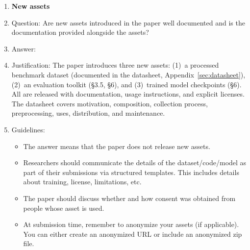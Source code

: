 \begin{enumerate}
\item {\bf New assets}
    \item[] Question: Are new assets introduced in the paper well documented and is the documentation provided alongside the assets?
    \item[] Answer: \answerYes{}
    \item[] Justification: The paper introduces three new assets:
      (1)~a processed benchmark dataset (documented in the datasheet,
      Appendix~\ref{sec:datasheet}), (2)~an evaluation toolkit (\S3.5, \S6), and
      (3)~trained model checkpoints (\S6).  All are released with
      documentation, usage instructions, and explicit licenses.
      The datasheet covers motivation, composition, collection
      process, preprocessing, uses, distribution, and maintenance.
    \item[] Guidelines:
    \begin{itemize}
        \item The answer \answerNA{} means that the paper does not release new assets.
        \item Researchers should communicate the details of the dataset\slash code\slash model as part of their submissions via structured templates. This includes details about training, license, limitations, etc. 
        \item The paper should discuss whether and how consent was obtained from people whose asset is used.
        \item At submission time, remember to anonymize your assets (if applicable). You can either create an anonymized URL or include an anonymized zip file.
    \end{itemize}


\end{enumerate}

